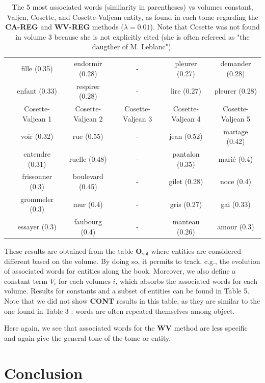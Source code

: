 \documentclass[
twocolumn,
]{ceurart}
\begin{document}
\begin{table}[!h]
\begin{tabular}{|c|c|c|c|c|c|}
		& fille (0.35) & endormir (0.28) & - & pleurer (0.27) & demander (0.28) \\
		& enfant (0.33) & respirer (0.28) & - & lire (0.27) & pleurer (0.28) \\
		\cline{2-6}
		& Cosette-Valjean 1 & Cosette-Valjean 2 & Cosette-Valjean 3 & Cosette-Valjean 4 & Cosette-Valjean 5 \\
		\cline{2-6}
		& voir (0.32) & rue (0.55) & - & jean (0.52) & mariage (0.42) \\ 
		& entendre (0.31) & ruelle (0.48) & - & pantalon (0.35) & marié (0.4) \\ 
		& frissonner (0.3) & boulevard (0.45) & - & gilet (0.28) & noce (0.4) \\ 
		& grommeler (0.3) & mur (0.4) & - & gris (0.27) & gai (0.33) \\ 
		& essayer (0.3) & faubourg (0.4) & - & manteau (0.26) & amour (0.3) \\ 
		\hline
	\end{tabular}
	\label{TIME_REG_word_vs_obj}
	\caption{The 5 most associated words (similarity in parentheses) vs volumes constant, Valjen, Cosette, and Cosette-Valjean entity, as found in each tome regarding the \textbf{CA-REG} and \textbf{WV-REG} methods ($\lambda = 0.01$). Note that Cosette was not found in volume 3 because she is not explicitly cited (she is often refereed as "the daugther of M. Leblanc").}
\end{table}

These results are obtained from the table $\mathbf{O}_\text{vol}$ where entities are considered different based on the volume. By doing so, it permits to track, e.g., the evolution of associated words for entities along the book. Moreover, we also define a constant term $V_i$ for each volumes $i$, which absorbs the associated words for each volume. Results for constants and a subset of entities can be found in Table 5. Note that we did not show \textbf{CONT} results in this table, as they are similar to the one found in Table 3 : words are often repeated themselves among object. 

Here again, we see that associated words for the \textbf{WV} method are less specific and again give the general tone of the tome or entity. 

\section{Conclusion}

\appendix
\end{document}
